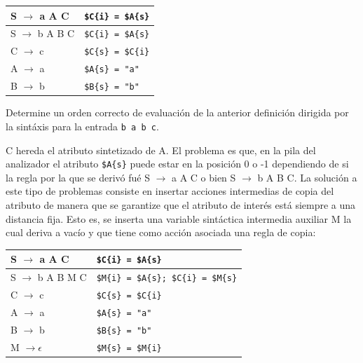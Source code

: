 \vspace{0.5cm}
\begin{center}
\begin{tabular}{|l|l|}
\hline
S $\rightarrow$ a A C   & \verb|$C{i} = $A{s}|\\
\hline
S $\rightarrow$ b A B C & \verb|$C{i} = $A{s}|\\
\hline
C $\rightarrow$ c       & \verb|$C{s} = $C{i}|\\
\hline
A $\rightarrow$ a       & \verb|$A{s} = "a"|\\
\hline
B $\rightarrow$ b       & \verb|$B{s} = "b"|\\
\hline
\end{tabular}
\end{center}
\vspace{0.25cm}


\begin{exercise}
Determine un orden correcto de evaluación de la anterior
definición dirigida por la sintáxis para la entrada \verb|b a b c|.
\end{exercise}

C hereda el atributo sintetizado de A. El problema es que, en la pila
del analizador el atributo \verb|$A{s}| puede estar en la posición 0 
o -1 dependiendo de si la regla por la que se derivó fué
S $\rightarrow$ a A C o bien S $\rightarrow$ b A B C. La solución
a este tipo de problemas consiste en insertar acciones 
intermedias de copia del atributo de manera que se garantize que el atributo
de interés está siempre a una distancia fija. Esto es, se inserta
una variable sintáctica intermedia auxiliar M la cual deriva a vacío
y que tiene como acción asociada una regla de copia:

\vspace{0.5cm}
\begin{center}
\begin{tabular}{|l|l|}
\hline
S $\rightarrow$ a A C   & \verb|$C{i} = $A{s}|\\
\hline
S $\rightarrow$ b A B M C & \verb|$M{i} = $A{s}; $C{i} = $M{s}|\\
\hline
C $\rightarrow$ c       & \verb|$C{s} = $C{i}|\\
\hline
A $\rightarrow$ a       & \verb|$A{s} = "a"|\\
\hline
B $\rightarrow$ b       & \verb|$B{s} = "b"|\\
\hline
M $\rightarrow \epsilon$& \verb|$M{s} = $M{i}|\\
\hline
\end{tabular}
\end{center}
\vspace{0.25cm}

